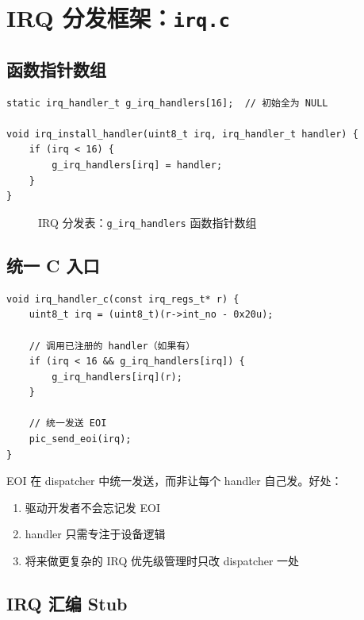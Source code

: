 \section{IRQ 分发框架：\texttt{irq.c}}

\subsection{函数指针数组}

\begin{lstlisting}[style=cstyle]
static irq_handler_t g_irq_handlers[16];  // 初始全为 NULL

void irq_install_handler(uint8_t irq, irq_handler_t handler) {
    if (irq < 16) {
        g_irq_handlers[irq] = handler;
    }
}
\end{lstlisting}

\begin{figure}[H]
  \centering
  
  \caption{IRQ 分发表：\texttt{g\_irq\_handlers} 函数指针数组}
\end{figure}

\subsection{统一 C 入口}

\begin{lstlisting}[style=cstyle]
void irq_handler_c(const irq_regs_t* r) {
    uint8_t irq = (uint8_t)(r->int_no - 0x20u);

    // 调用已注册的 handler（如果有）
    if (irq < 16 && g_irq_handlers[irq]) {
        g_irq_handlers[irq](r);
    }

    // 统一发送 EOI
    pic_send_eoi(irq);
}
\end{lstlisting}

\begin{designbox}
EOI 在 dispatcher 中统一发送，而非让每个 handler 自己发。好处：
\begin{enumerate}
  \item 驱动开发者不会忘记发 EOI
  \item handler 只需专注于设备逻辑
  \item 将来做更复杂的 IRQ 优先级管理时只改 dispatcher 一处
\end{enumerate}
\end{designbox}

\subsection{IRQ 汇编 Stub}


